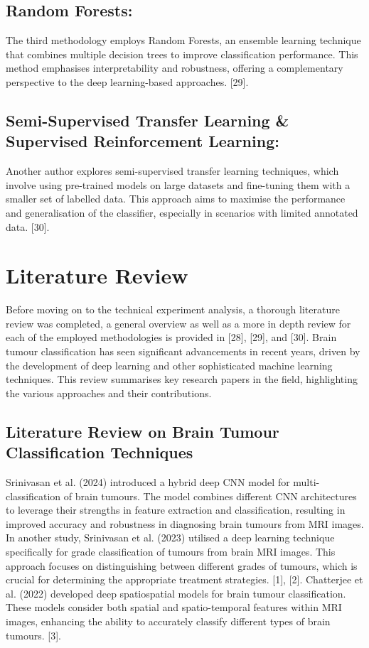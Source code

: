\documentclass[conference]{IEEEtran}
\begin{document}
\subsection{Random Forests:}
 The third methodology employs Random Forests, an ensemble learning technique that combines multiple decision trees to improve classification performance. This method emphasises interpretability and robustness, offering a complementary perspective to the deep learning-based approaches. [29].

\subsection{Semi-Supervised Transfer Learning \& Supervised 
 Reinforcement Learning:}
Another author explores semi-supervised transfer learning techniques, which involve using pre-trained models on large datasets and fine-tuning them with a smaller set of labelled data. This approach aims to maximise the performance and generalisation of the classifier, especially in scenarios with limited annotated data. [30].

\section{Literature Review}
Before moving on to the technical experiment analysis, a thorough literature review was completed, a general overview as well as a more in depth review for each of the employed methodologies is provided in [28], [29], and [30]. Brain tumour classification has seen significant advancements in recent years, driven by the development of deep learning and other sophisticated machine learning techniques. This review summarises key research papers in the field, highlighting the various approaches and their contributions. 

\subsection{Literature Review on Brain Tumour Classification Techniques}
Srinivasan et al. (2024) introduced a hybrid deep CNN model for multi-classification of brain tumours. The model combines different CNN architectures to leverage their strengths in feature extraction and classification, resulting in improved accuracy and robustness in diagnosing brain tumours from MRI images. In another study, Srinivasan et al. (2023) utilised a deep learning technique specifically for grade classification of tumours from brain MRI images. This approach focuses on distinguishing between different grades of tumours, which is crucial for determining the appropriate treatment strategies. [1], [2]. Chatterjee et al. (2022) developed deep spatiospatial models for brain tumour classification. These models consider both spatial and spatio-temporal features within MRI images, enhancing the ability to accurately classify different types of brain tumours. [3].
\end{document}
